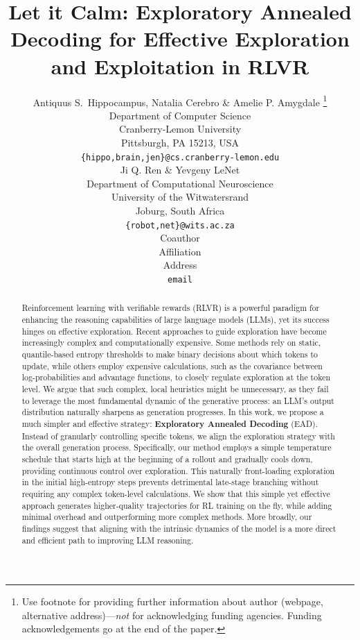 \documentclass{article} %
\title{Let it Calm: Exploratory Annealed Decoding for Effective Exploration and Exploitation in RLVR}
\author{Antiquus S.~Hippocampus, Natalia Cerebro \& Amelie P. Amygdale \thanks{ Use footnote for providing further information
about author (webpage, alternative address)---\emph{not} for acknowledging
funding agencies.  Funding acknowledgements go at the end of the paper.} \\
Department of Computer Science\\
Cranberry-Lemon University\\
Pittsburgh, PA 15213, USA \\
\texttt{\{hippo,brain,jen\}@cs.cranberry-lemon.edu} \\
\And
Ji Q. Ren \& Yevgeny LeNet \\
Department of Computational Neuroscience \\
University of the Witwatersrand \\
Joburg, South Africa \\
\texttt{\{robot,net\}@wits.ac.za} \\
\AND
Coauthor \\
Affiliation \\
Address \\
\texttt{email}
}
\newcommand{\ych}[1]{\textcolor{purple}{[#1 -Chenghao]}}
\newcommand{\algname}{Exploratory Annealed Decoding\xspace}
\begin{document}
\maketitle

\begin{abstract}
Reinforcement learning with verifiable rewards (RLVR) is a powerful paradigm for enhancing the reasoning capabilities of large language models (LLMs), yet its success hinges on effective exploration. 
%
Recent approaches to guide exploration have become increasingly complex and computationally expensive. 
%
Some methods rely on static, quantile-based entropy thresholds to make binary decisions about which tokens to update, while others employ expensive calculations, such as the covariance between log-probabilities and advantage functions, to closely regulate exploration at the token level.
%
We argue that such complex, local heuristics might be unnecessary, as they fail to leverage the most fundamental dynamic of the generative process: 
an LLM's output distribution naturally sharpens as generation progresses.
%
In this work, we propose a much simpler and effective strategy: \textbf{\algname} (EAD).
%
Instead of granularly controlling specific tokens, 
we align the exploration strategy with the overall generation process.
%
Specifically, our method employs a simple temperature schedule that starts high at the beginning of a rollout and gradually cools down, providing continuous control over exploration. 
%
This naturally front-loading exploration in the initial high-entropy steps prevents detrimental late-stage branching without requiring any complex token-level calculations. 
%
We show that this simple yet effective approach generates higher-quality trajectories for RL training on the fly, while adding minimal overhead and outperforming more complex methods.
%
More broadly, our findings suggest that aligning with the intrinsic dynamics of the model is a more direct and efficient path to improving LLM reasoning.
%
\end{abstract}
\end{document}
